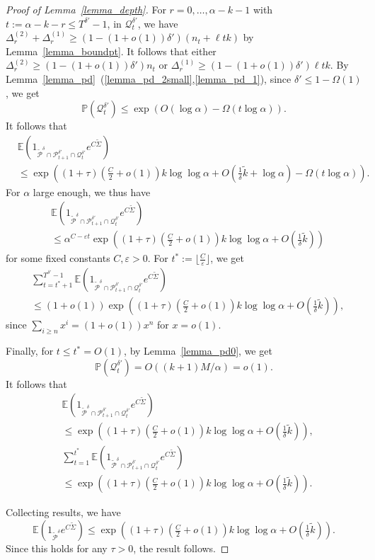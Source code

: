 \documentclass{article}
\theoremstyle{plain}
\theoremstyle{remark}
\theoremstyle{plain}
\numberwithin{equation}{section}
\begin{document}
\begin{proof}[Proof of Lemma~\ref{lemma_depth}]
		For $r=0,\ldots,\alpha-k-1$ with $t:=\alpha-k-r\leq T^{\delta'}-1$, in $\mathcal{Q}_t^{\delta'}$, we have $\Delta_r^{(2)}+\Delta_r^{(1)}\geq(1-(1+o(1))\delta')(n_t+\ell tk)$ by Lemma~\ref{lemma_boundpt}. It follows that either $\Delta_r^{(2)}\geq(1-(1+o(1))\delta')n_t$ or $\Delta_r^{(1)}\geq(1-(1+o(1))\delta')\ell tk$. By Lemma~\ref{lemma_pd}~(\ref{lemma_pd_2small},\ref{lemma_pd_1}), since $\delta'\leq1-\Omega(1)$, we get $$\mathbb{P}(\mathcal{Q}_t^{\delta'})\leq\exp(O(\log\alpha)-\Omega(t\log\alpha)).$$ It follows that
		\begin{align}
			&\mathbb{E}(1_{\widetilde{\mathcal{P}}^{\delta}\cap\mathcal{P}_{t+1}^{\delta'}\cap\mathcal{Q}_t^{\delta'}}e^{C\tilde{\Sigma}})
			\\&\leq\exp\left((1+\tau)(\tfrac{C}{2}+o(1))k\log\log\alpha+O(\tfrac1{\delta}\widetilde{k}+\log\alpha)-\Omega(t\log\alpha)\right).
		\end{align}
		For $\alpha$ large enough, we thus have
		\begin{align}
			&\mathbb{E}(1_{\widetilde{\mathcal{P}}^{\delta}\cap\mathcal{P}_{t+1}^{\delta'}\cap\mathcal{Q}_t^{\delta'}}e^{C\tilde{\Sigma}})
			\\&\leq\alpha^{C-\varepsilon t}\exp\left((1+\tau)(\tfrac{C}{2}+o(1))k\log\log\alpha+O(\tfrac1{\delta}\widetilde{k})\right)
		\end{align}
		for some fixed constants $C,\varepsilon>0$. For $t^*:=\lfloor\tfrac{C}{\varepsilon}\rfloor$, we get
		\begin{align}
			&\sum_{t=t^*+1}^{T^{\delta'}-1}\mathbb{E}(1_{\widetilde{\mathcal{P}}^{\delta}\cap\mathcal{P}_{t+1}^{\delta'}\cap\mathcal{Q}_t^{\delta'}}e^{C\tilde{\Sigma}})
			\\&\leq(1+o(1))\exp\left((1+\tau)(\tfrac{C}{2}+o(1))k\log\log\alpha+O(\tfrac1{\delta}\widetilde{k})\right),
		\end{align}
		since $\sum_{i\geq n}x^i=(1+o(1))x^n$ for $x=o(1)$.
		
		Finally, for $t\leq t^*=O(1)$, by Lemma~\ref{lemma_pd0}, we get $$\mathbb{P}(\mathcal{Q}_t^{\delta'})=O((k+1)M/\alpha)=o(1).$$ It follows that
		\begin{align}
			&\mathbb{E}(1_{\widetilde{\mathcal{P}}^{\delta}\cap\mathcal{P}_{t+1}^{\delta'}\cap\mathcal{Q}_t^{\delta'}}e^{C\tilde{\Sigma}})
			\\&\leq\exp\left((1+\tau)(\tfrac{C}{2}+o(1))k\log\log\alpha+O(\tfrac1{\delta}\widetilde{k})\right),
			\\&\sum_{t=1}^{t^*}\mathbb{E}(1_{\widetilde{\mathcal{P}}^{\delta}\cap\mathcal{P}_{t+1}^{\delta'}\cap\mathcal{Q}_t^{\delta'}}e^{C\tilde{\Sigma}})
			\\&\leq\exp\left((1+\tau)(\tfrac{C}{2}+o(1))k\log\log\alpha+O(\tfrac1{\delta}\widetilde{k})\right).
		\end{align}
		
		Collecting results, we have $$\mathbb{E}(1_{\widetilde{\mathcal{P}}^{\delta}}e^{C\tilde{\Sigma}})\leq\exp\left((1+\tau)(\tfrac{C}{2}+o(1))k\log\log\alpha+O(\tfrac1{\delta}\widetilde{k})\right).$$ Since this holds for any $\tau>0$, the result follows.
	\end{proof}
	
\end{document}
